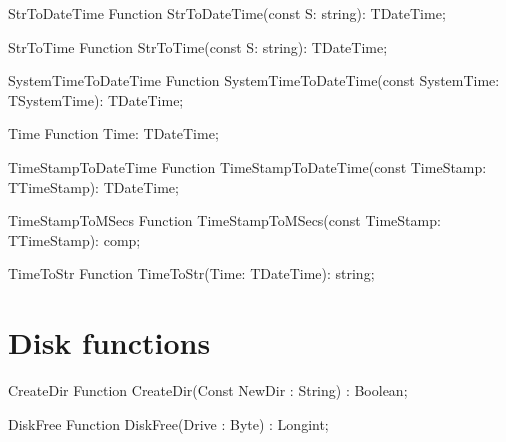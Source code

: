 \html{}

\begin{function}{StrToDateTime}
\Declaration
Function StrToDateTime(const S: string): TDateTime;
\Description

\Errors
\SeeAlso
\end{function}

 
\begin{function}{StrToTime}
\Declaration
Function StrToTime(const S: string): TDateTime;
\Description
\Errors
\SeeAlso
\end{function}

 
\begin{function}{SystemTimeToDateTime}
\Declaration
Function SystemTimeToDateTime(const SystemTime: TSystemTime): TDateTime;
\Description
\Errors
\SeeAlso
\end{function}

 
\begin{function}{Time}
\Declaration
Function Time: TDateTime;
\Description
\Errors
\SeeAlso
\end{function}

 
\begin{function}{TimeStampToDateTime}
\Declaration
Function TimeStampToDateTime(const TimeStamp: TTimeStamp): TDateTime;
\Description
\Errors
\SeeAlso
\end{function}

 
\begin{function}{TimeStampToMSecs}
\Declaration
Function TimeStampToMSecs(const TimeStamp: TTimeStamp): comp;
\Description
\Errors
\SeeAlso
\end{function}

 
\begin{function}{TimeToStr}
\Declaration
Function TimeToStr(Time: TDateTime): string;
\Description
\Errors
\SeeAlso
\end{function}

 

\section{Disk functions}

\begin{function}{CreateDir}
\Declaration
Function CreateDir(Const NewDir : String) : Boolean;
\Description
\Errors
\SeeAlso
\end{function}

 
\begin{function}{DiskFree}
\Declaration
Function DiskFree(Drive : Byte) : Longint;
\Description
\Errors
\SeeAlso
\end{function}

